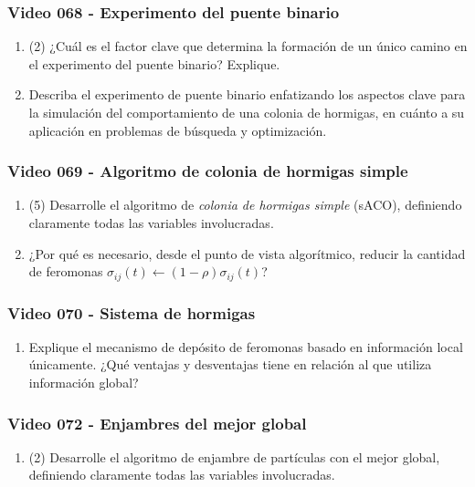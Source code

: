 \documentclass[a4paper,10pt,spanish]{article}
\begin{document}
\subsubsection{Video 068 - Experimento del puente binario}

\begin{enumerate}
\item (2) ¿Cuál es el factor clave que determina la formación de un único camino en el experimento del puente binario? Explique.

\item Describa el experimento de puente binario enfatizando los aspectos clave para la simulación del comportamiento de una colonia de hormigas, en cuánto a su aplicación en problemas de búsqueda y optimización.
\end{enumerate}

\subsubsection{Video 069 - Algoritmo de colonia de hormigas simple}

\begin{enumerate}
\item (5) Desarrolle el algoritmo de \textit{colonia de hormigas simple} (sACO), definiendo claramente todas las variables involucradas.

\item ¿Por qué es necesario, desde el punto de vista algorítmico, reducir la cantidad de feromonas $\sigma_{ij}(t)\leftarrow (1-\rho)\sigma_{ij}(t)$?
\end{enumerate}

\subsubsection{Video 070 - Sistema de hormigas}

\begin{enumerate}
\item Explique el mecanismo de depósito de feromonas basado en información local únicamente. ¿Qué ventajas y desventajas tiene en relación al que utiliza información global?
\end{enumerate}

\subsubsection{Video 072 - Enjambres del mejor global}

\begin{enumerate}
\item (2) Desarrolle el algoritmo de enjambre de partículas con el mejor global, definiendo claramente todas las variables involucradas.
\end{enumerate}
\end{document}

